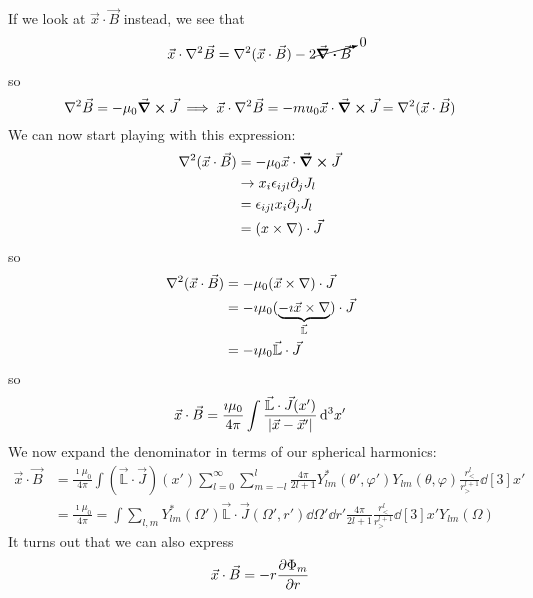\documentclass[a4paper,twoside,master.tex]{subfiles}
\begin{document}
If we look at $ \vec{x} \cdot \vec{B} $ instead, we see that
\begin{equation}
    \vec{x} \cdot \laplacian{ \vec{B}} = \laplacian{( \vec{x} \cdot \vec{B} )} - 2 \cancelto{0}{\div{ \vec{B}}}
\end{equation}
so
\begin{equation}
    \laplacian{ \vec{B}} = - \mu_0 \curl{ \vec{J}} \implies \vec{x} \cdot \laplacian{ \vec{B}} = -mu_0 \vec{x} \cdot \curl{ \vec{J}} = \laplacian{( \vec{x} \cdot \vec{B})}
\end{equation}
We can now start playing with this expression:
\begin{align}
    \laplacian{( \vec{x} \cdot \vec{B})} &= - \mu_0 \vec{x} \cdot \curl{ \vec{J}}\\
    &\rightarrow x_i \epsilon_{ijl} \partial_j J_l\\
    &= \epsilon_{ijl} x_i\partial_j J_l\\
    &= ( x \times \nabla) \cdot \vec{J}
\end{align}
so
\begin{align}
    \laplacian{( \vec{x} \cdot \vec{B})} &= - \mu_0 ( \vec{x} \times \nabla ) \cdot \vec{J}\\
    &= -\imath \mu_0 (\underbrace{-\imath \vec{x} \times \nabla}_{ \vec{\mathbb{L}}}) \cdot \vec{J}\\
    &= -\imath\mu_0 \vec{\mathbb{L}} \cdot \vec{J}
\end{align}
so
\begin{equation}
    \vec{x} \cdot \vec{B} = \frac{\imath \mu_0}{4 \pi} \int \frac{\vec{\mathbb{L}} \cdot \vec{J}(x')}{\abs{ \vec{x} - \vec{x}'}} \dd[3]{x'}
\end{equation}
We now expand the denominator in terms of our spherical harmonics:
\begin{align}
    \vec{x} \cdot \vec{B} &= \frac{\imath \mu_0}{4 \pi} \int ( \vec{\mathbb{L}} \cdot \vec{J})(x') \sum_{l=0}^{\infty} \sum_{m=-l}^{l} \frac{4 \pi}{2l+1} Y_{lm}^*(\theta', \varphi')Y_{lm}(\theta, \varphi) \frac{r_<^l}{r_>^{l+1}} \dd[3]{x'}\\
    &= \frac{\imath \mu_0}{4 \pi} = \int \sum_{l,m} Y_{lm}^*(\Omega') \vec{\mathbb{L}} \cdot \vec{J}(\Omega',r') \dd{\Omega'} \dd{r'} \frac{4 \pi}{2l+1} \frac{r_<^l}{r_>^{l+1}} \dd[3]{x'} Y_{lm} (\Omega)
\end{align}
It turns out that we can also express
\begin{equation}
    \vec{x} \cdot \vec{B} = -r \pdv{\Phi_m}{r}
\end{equation}
\end{document}
